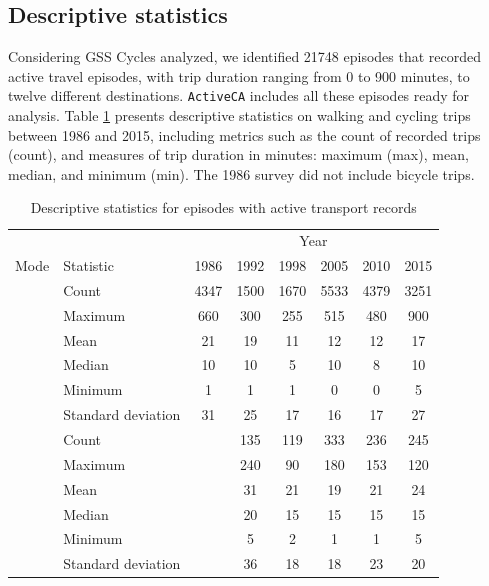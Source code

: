 \documentclass[Royal,times,sageh]{sagej}
\begin{document}
\hypertarget{descriptive-statistics}{%
\subsection{Descriptive statistics}\label{descriptive-statistics}}

Considering GSS Cycles analyzed, we identified 21748 episodes that
recorded active travel episodes, with trip duration ranging from 0 to
900 minutes, to twelve different destinations. \texttt{ActiveCA}
includes all these episodes ready for analysis. Table \ref{tab:table-01}
presents descriptive statistics on walking and cycling trips between
1986 and 2015, including metrics such as the count of recorded trips
(count), and measures of trip duration in minutes: maximum (max), mean,
median, and minimum (min). The 1986 survey did not include bicycle
trips.

\begingroup\fontsize{10}{12}\selectfont

\begin{longtable}[t]{>{}llcccccc}
\caption{\label{tab:table-01}\label{tab:table-01}Descriptive statistics for episodes with active transport records}\\
\toprule
\multicolumn{2}{c}{ } & \multicolumn{6}{c}{Year} \\
\cmidrule(l{3pt}r{3pt}){3-8}
Mode & Statistic & 1986 & 1992 & 1998 & 2005 & 2010 & 2015\\
\midrule
 & Count & 4347 & 1500 & 1670 & 5533 & 4379 & 3251\\
\nopagebreak
 & Maximum & 660 & 300 & 255 & 515 & 480 & 900\\
\nopagebreak
 & Mean & 21 & 19 & 11 & 12 & 12 & 17\\
\nopagebreak
 & Median & 10 & 10 & 5 & 10 & 8 & 10\\
\nopagebreak
 & Minimum & 1 & 1 & 1 & 0 & 0 & 5\\
\nopagebreak
\multirow[t]{-6}{*}{\raggedright\arraybackslash \textbf{Walking}} & Standard deviation & 31 & 25 & 17 & 16 & 17 & 27\\
\cmidrule{1-8}\pagebreak[0]
 & Count &  & 135 & 119 & 333 & 236 & 245\\
\nopagebreak
 & Maximum &  & 240 & 90 & 180 & 153 & 120\\
\nopagebreak
 & Mean &  & 31 & 21 & 19 & 21 & 24\\
\nopagebreak
 & Median &  & 20 & 15 & 15 & 15 & 15\\
\nopagebreak
 & Minimum &  & 5 & 2 & 1 & 1 & 5\\
\nopagebreak
\multirow[t]{-6}{*}{\raggedright\arraybackslash \textbf{Cycling}} & Standard deviation &  & 36 & 18 & 18 & 23 & 20\\
\bottomrule
\end{longtable}
\endgroup{}
\end{document}
